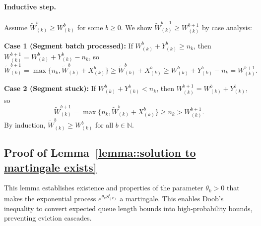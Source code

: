 \paragraph{Inductive step.} Assume $\tilde{W}^b_{(k)}\geq W^b_{(k)}$ for some $b\geq 0$. We show $\tilde{W}^{b+1}_{(k)}\geq W^{b+1}_{(k)}$ by case analysis:

\textbf{Case 1 (Segment batch processed):} If $W^b_{(k)}+ Y^b_{(k)}\geq n_k$, then $W^{b+1}_{(k)}= W^{b}_{(k)}+Y^b_{(k)} - n_k$, so
$$ \tilde{W}^{b+1}_{(k)}=  \max\{ n_{k},\tilde{W}^{b}_{(k)} + X^b_{(k)}\} \geq \tilde{W}^{b}_{(k)} + X^b_{(k)}\geq {W}^{b}_{(k)} + Y^b_{(k)}-n_k=W^{b+1}_{(k)}.$$

\textbf{Case 2 (Segment stuck):} If $W^b_{(k)}+ Y^b_{(k)}<n_k$, then $W^{b+1}_{(k)}= W^{b}_{(k)}+Y^b_{(k)}$, so
$$\tilde{W}^{b+1}_{(k)}=  \max\{ n_{k},\tilde{W}^{b}_{(k)} + X^b_{(k)}\} \geq n_{k}> W^{b+1}_{(k)}.$$
By induction, $\tilde{W}^b_{(k)}\geq W^b_{(k)}$ for all $b\in \mathbb{N}$.

\subsection{Proof of Lemma~\ref{lemma::solution to martingale exists}}\label{appendix_lemma::proof of solution to martingale exists}
This lemma establishes existence and properties of the parameter $\theta_k>0$ that makes the exponential process $e^{\theta_k S^i_{(k)}}$ a martingale. This enables Doob's inequality to convert expected queue length bounds into high-probability bounds, preventing eviction cascades.

